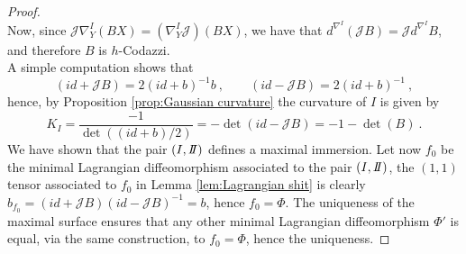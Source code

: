 \begin{proof}
\[    \]
    Now, since $\mathcal{J}\nabla^I_Y(BX) = (\nabla^I_Y \mathcal{J})(BX)$, we have that $d^{\nabla^I} (\mathcal{J}B) = \mathcal{J} d^{\nabla^I} B$, and therefore $B$ is $h$-Codazzi.\\
    A simple computation shows that 
    \begin{equation}\label{eq:roba}
        (id+ \mathcal{J}B) = 2(id +b)^{-1} b  \ , \qquad (id- \mathcal{J}B) = 2(id +b)^{-1} \ ,
    \end{equation}
     hence, by Proposition \ref{prop:Gaussian curvature} the curvature of $I$ is given by
    \[
        K_I = \frac{-1}{\det((id+b)/2)} = -\det(id - \mathcal{J}B) = -1 - \det(B) \ .
    \]
    We have shown that the pair $(\I,\II)$ defines a maximal immersion.
    Let now $f_0$ be the minimal Lagrangian diffeomorphism associated to the pair $(I,\II)$, the $(1,1)$ tensor associated to $f_0$ in Lemma \ref{lem:Lagrangian shit} is clearly $b_{f_0} = (id+\mathcal{J}B)(id-\mathcal{J}B)^{-1} = b$, hence $f_0 = \Phi$. The uniqueness of the maximal surface ensures that any other minimal Lagrangian diffeomorphism $\Phi'$ is equal, via the same construction, to $f_0=\Phi$, hence the uniqueness.
\end{proof}
